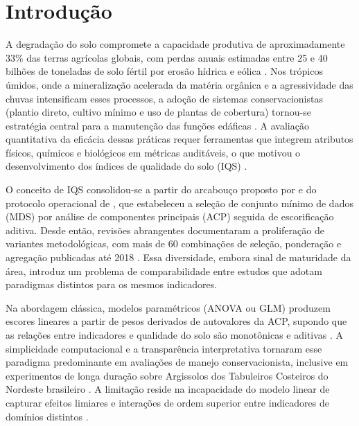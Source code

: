 \documentclass[pdflatex,sn-basic]{sn-jnl}%
\begin{document}

\maketitle

\section{Introdução}\label{sec:intro}

A degradação do solo compromete a capacidade produtiva de aproximadamente 33\% das terras agrícolas globais, com perdas anuais estimadas entre 25 e 40 bilhões de toneladas de solo fértil por erosão hídrica e eólica \cite{Lal2015}. Nos trópicos úmidos, onde a mineralização acelerada da matéria orgânica e a agressividade das chuvas intensificam esses processos, a adoção de sistemas conservacionistas (plantio direto, cultivo mínimo e uso de plantas de cobertura) tornou-se estratégia central para a manutenção das funções edáficas \cite{Doran2002,Cardoso2013}. A avaliação quantitativa da eficácia dessas práticas requer ferramentas que integrem atributos físicos, químicos e biológicos em métricas auditáveis, o que motivou o desenvolvimento dos índices de qualidade do solo (IQS) \cite{Karlen1997}.

O conceito de IQS consolidou-se a partir do arcabouço proposto por \cite{Karlen1997} e do protocolo operacional de \cite{Andrews2002}, que estabeleceu a seleção de conjunto mínimo de dados (MDS) por análise de componentes principais (ACP) seguida de escorificação aditiva. Desde então, revisões abrangentes documentaram a proliferação de variantes metodológicas, com mais de 60 combinações de seleção, ponderação e agregação publicadas até 2018 \cite{Bünemann2018}. Essa diversidade, embora sinal de maturidade da área, introduz um problema de comparabilidade entre estudos que adotam paradigmas distintos para os mesmos indicadores.

Na abordagem clássica, modelos paramétricos (ANOVA ou GLM) produzem escores lineares a partir de pesos derivados de autovalores da ACP, supondo que as relações entre indicadores e qualidade do solo são monotônicas e aditivas \cite{Mukherjee2014}. A simplicidade computacional e a transparência interpretativa tornaram esse paradigma predominante em avaliações de manejo conservacionista, inclusive em experimentos de longa duração sobre Argissolos dos Tabuleiros Costeiros do Nordeste brasileiro \cite{Assuncao2023}. A limitação reside na incapacidade do modelo linear de capturar efeitos limiares e interações de ordem superior entre indicadores de domínios distintos \cite{DosSantos2021}.
\end{document}
